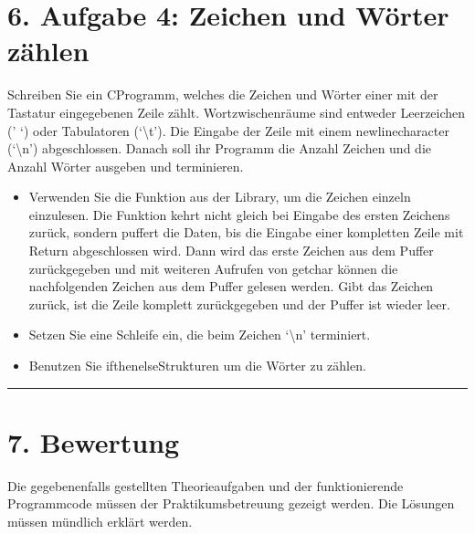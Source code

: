 \documentclass[a4paper,10pt,english]{report}
\begin{document}
\section{6. Aufgabe 4: Zeichen und Wörter zählen}
\label{\detokenize{P01_Erste_Schritte_mit_C/README:aufgabe-4-zeichen-und-worter-zahlen}}
\sphinxAtStartPar
Schreiben Sie ein C\sphinxhyphen{}Programm, welches die Zeichen und Wörter einer mit der Tastatur eingegebenen Zeile zählt. Wortzwischenräume sind entweder Leerzeichen (’ ‘) oder Tabulatoren (‘\textbackslash{}t’). Die Eingabe der Zeile mit einem newline\sphinxhyphen{}character (‘\textbackslash{}n’) abgeschlossen. Danach soll ihr Programm die Anzahl Zeichen und die Anzahl Wörter ausgeben und terminieren.
\begin{itemize}
\item {} 
\sphinxAtStartPar
Verwenden Sie die  Funktion aus der  Library, um die Zeichen einzeln einzulesen. Die Funktion  kehrt nicht gleich bei Eingabe des ersten Zeichens zurück, sondern puffert die Daten, bis die Eingabe einer kompletten Zeile mit Return abgeschlossen wird. Dann wird das erste Zeichen aus dem Puffer zurückgegeben und mit weiteren Aufrufen von getchar können die nachfolgenden Zeichen aus dem Puffer gelesen werden. Gibt  das Zeichen  zurück, ist die Zeile komplett zurückgegeben und der Puffer ist wieder leer.

\item {} 
\sphinxAtStartPar
Setzen Sie eine Schleife ein, die beim Zeichen ‘\textbackslash{}n’ terminiert.

\item {} 
\sphinxAtStartPar
Benutzen Sie if\sphinxhyphen{}then\sphinxhyphen{}else\sphinxhyphen{}Strukturen um die Wörter zu zählen.

\end{itemize}


\bigskip\hrule\bigskip



\section{7. Bewertung}
\label{\detokenize{P01_Erste_Schritte_mit_C/README:bewertung}}
\sphinxAtStartPar
Die gegebenenfalls gestellten Theorieaufgaben und der funktionierende Programmcode müssen der Praktikumsbetreuung gezeigt werden. Die Lösungen müssen mündlich erklärt werden.
\end{document}

